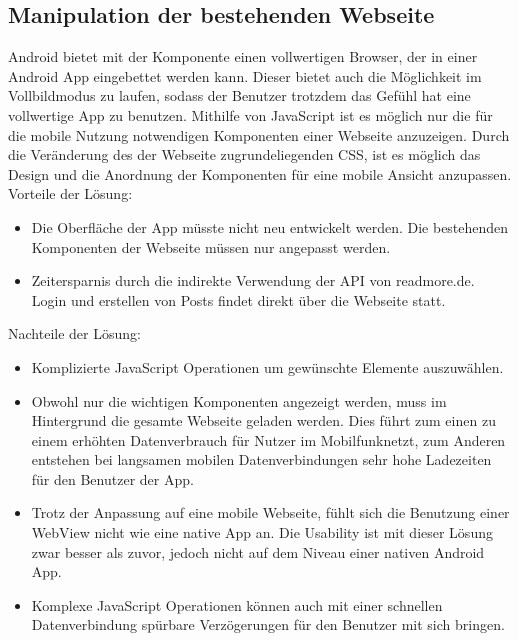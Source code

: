 \subsection{Manipulation der bestehenden Webseite}
Android bietet mit der  Komponente einen vollwertigen
Browser, der in einer Android App eingebettet werden kann. Dieser bietet auch
die Möglichkeit im Vollbildmodus zu laufen, sodass der Benutzer trotzdem das
Gefühl hat eine vollwertige App zu benutzen. Mithilfe von JavaScript ist es
möglich nur die für die mobile Nutzung notwendigen Komponenten einer Webseite
anzuzeigen. Durch die Veränderung des der Webseite zugrundeliegenden CSS, ist es
möglich das Design und die Anordnung der Komponenten für eine mobile Ansicht
anzupassen. \\
Vorteile der Lösung:
\begin{itemize}
  \item Die Oberfläche der App müsste nicht neu entwickelt werden. Die
  bestehenden Komponenten der Webseite müssen nur angepasst werden.
  \item Zeitersparnis durch die indirekte Verwendung der API von readmore.de.
  Login und erstellen von Posts findet direkt über die Webseite statt.
\end{itemize}
Nachteile der Lösung:
\begin{itemize}
  \item Komplizierte JavaScript Operationen um gewünschte Elemente auszuwählen.
  \item Obwohl nur die wichtigen Komponenten angezeigt werden, muss im
  Hintergrund die gesamte Webseite geladen werden. Dies führt zum einen zu einem
  erhöhten Datenverbrauch für Nutzer im Mobilfunknetzt, zum Anderen entstehen
  bei langsamen mobilen Datenverbindungen sehr hohe Ladezeiten für den Benutzer
  der App.
  \item Trotz der Anpassung auf eine mobile Webseite, fühlt sich die Benutzung
  einer WebView nicht wie eine native App an. Die Usability ist mit dieser
  Lösung zwar besser als zuvor, jedoch nicht auf dem Niveau einer nativen
  Android App.
  \item Komplexe JavaScript Operationen können auch mit einer schnellen
  Datenverbindung spürbare Verzögerungen für den Benutzer mit sich bringen.
\end{itemize}
